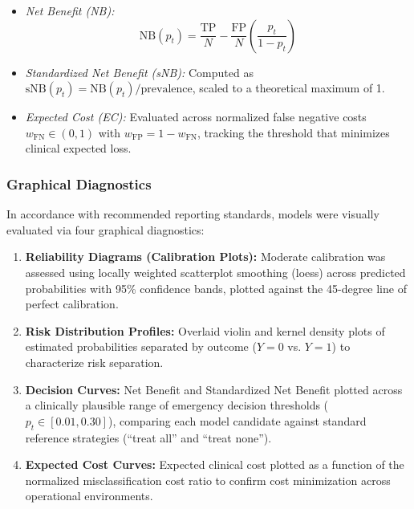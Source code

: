 \begin{itemize}
    \begin{itemize}
        \item \textit{Net Benefit (NB):}
        \begin{equation}
            \text{NB}(p_t) = \frac{\text{TP}}{N} - \frac{\text{FP}}{N}\left(\frac{p_t}{1 - p_t}\right)
        \end{equation}
        \item \textit{Standardized Net Benefit (sNB):} Computed as $\text{sNB}(p_t) = \text{NB}(p_t) / \text{prevalence}$, scaled to a theoretical maximum of 1.
        \item \textit{Expected Cost (EC):} Evaluated across normalized false negative costs $w_{\text{FN}} \in (0, 1)$ with $w_{\text{FP}} = 1 - w_{\text{FN}}$, tracking the threshold that minimizes clinical expected loss.
    \end{itemize}
\end{itemize}

\subsubsection{Graphical Diagnostics}
In accordance with recommended reporting standards, models were visually evaluated via four graphical diagnostics:
\begin{enumerate}
    \item \textbf{Reliability Diagrams (Calibration Plots):} Moderate calibration was assessed using locally weighted scatterplot smoothing (loess) across predicted probabilities with 95\% confidence bands, plotted against the 45-degree line of perfect calibration.
    \item \textbf{Risk Distribution Profiles:} Overlaid violin and kernel density plots of estimated probabilities separated by outcome ($Y=0$ vs. $Y=1$) to characterize risk separation.
    \item \textbf{Decision Curves:} Net Benefit and Standardized Net Benefit plotted across a clinically plausible range of emergency decision thresholds ($p_t \in [0.01, 0.30]$), comparing each model candidate against standard reference strategies (``treat all'' and ``treat none'').
    \item \textbf{Expected Cost Curves:} Expected clinical cost plotted as a function of the normalized misclassification cost ratio to confirm cost minimization across operational environments.
\end{enumerate}